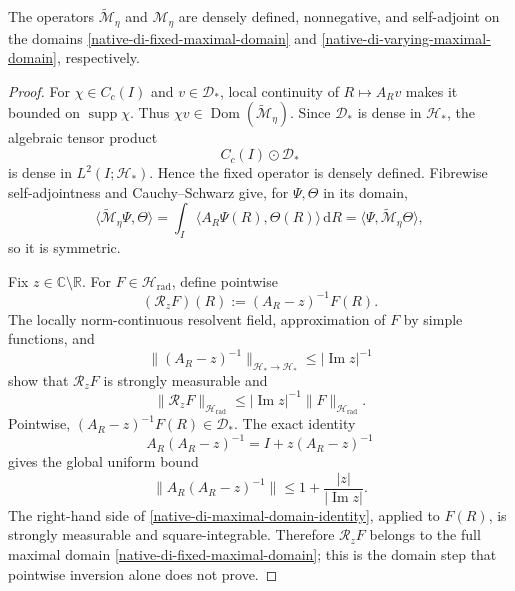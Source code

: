 \begin{proposition}
\label{native-di-self-adjoint-proposition}
The operators \(\widetilde{\mathscr M}_\eta\) and
\(\mathscr M_\eta\) are densely defined, nonnegative, and self-adjoint on
the domains \eqref{native-di-fixed-maximal-domain} and
\eqref{native-di-varying-maximal-domain}, respectively.
\end{proposition}

\begin{proof}
For \(\chi\in C_c(I)\) and \(v\in\mathscr D_*\), local continuity of
\(R\mapsto A_Rv\) makes it bounded on \(\operatorname{supp}\chi\).
Thus \(\chi v\in\operatorname{Dom}(\widetilde{\mathscr M}_\eta)\).  Since
\(\mathscr D_*\) is dense in \(\mathscr H_*\), the algebraic tensor product
\[
 C_c(I)\mathbin{\odot}\mathscr D_*
\]
is dense in \(L^2(I;\mathscr H_*)\).  Hence the fixed operator is densely
defined.  Fibrewise self-adjointness and Cauchy--Schwarz give, for
\(\Psi,\Theta\) in its domain,
\[
 \langle\widetilde{\mathscr M}_\eta\Psi,\Theta\rangle
 =\int_I\langle A_R\Psi(R),\Theta(R)\rangle\,\mathrm d R
 =\langle\Psi,\widetilde{\mathscr M}_\eta\Theta\rangle,
\]
so it is symmetric.

Fix \(z\in\mathbb C\setminus\mathbb R\).  For
\(F\in\mathscr H_{\mathrm{rad}}\), define pointwise
\begin{equation}
 (\mathcal R_zF)(R):=(A_R-z)^{-1}F(R).
\label{native-di-radial-resolvent}
\end{equation}
The locally norm-continuous resolvent field, approximation of \(F\) by
simple functions, and
\[
 \|(A_R-z)^{-1}\|_{\mathscr H_*\to\mathscr H_*}
 \le|\operatorname{Im}z|^{-1}
\]
show that \(\mathcal R_zF\) is strongly measurable and
\begin{equation}
 \|\mathcal R_zF\|_{\mathscr H_{\mathrm{rad}}}
 \le|\operatorname{Im}z|^{-1}
    \|F\|_{\mathscr H_{\mathrm{rad}}}.
\label{native-di-radial-resolvent-L2}
\end{equation}
Pointwise, \((A_R-z)^{-1}F(R)\in\mathscr D_*\).  The exact identity
\begin{equation}
 A_R(A_R-z)^{-1}=I+z(A_R-z)^{-1}
\label{native-di-maximal-domain-identity}
\end{equation}
gives the global uniform bound
\[
 \|A_R(A_R-z)^{-1}\|
 \le1+\frac{|z|}{|\operatorname{Im}z|}.
\]
The right-hand side of \eqref{native-di-maximal-domain-identity}, applied
to \(F(R)\), is strongly measurable and square-integrable.  Therefore
\(\mathcal R_zF\) belongs to the full maximal domain
\eqref{native-di-fixed-maximal-domain}; this is the domain step that
pointwise inversion alone does not prove.


\end{proof}
